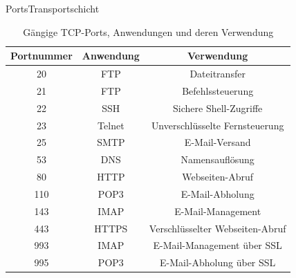 \begin{frame}[fragile]{\faShip{} Ports}{Transportschicht}
    \begin{table}[H]
        \centering
        \begin{tabular}{ccc}
            \toprule
            \textbf{Portnummer} & \textbf{Anwendung} & \textbf{Verwendung}             \\
            \midrule
            20                  & FTP                & Dateitransfer                   \\
            21                  & FTP                & Befehlssteuerung                \\
            22                  & SSH                & Sichere Shell-Zugriffe          \\
            23                  & Telnet             & Unverschlüsselte Fernsteuerung  \\
            25                  & SMTP               & E-Mail-Versand                  \\
            53                  & DNS                & Namensauflösung                 \\
            80                  & HTTP               & Webseiten-Abruf                 \\
            110                 & POP3               & E-Mail-Abholung                 \\
            143                 & IMAP               & E-Mail-Management               \\
            443                 & HTTPS              & Verschlüsselter Webseiten-Abruf \\
            993                 & IMAP               & E-Mail-Management über SSL      \\
            995                 & POP3               & E-Mail-Abholung über SSL        \\
            \bottomrule
        \end{tabular}
        \caption*{Gängige TCP-Ports, Anwendungen und deren Verwendung}
    \end{table}
\end{frame}

